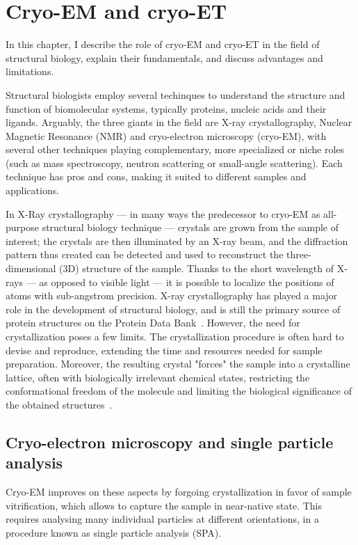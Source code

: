 \chapter{Cryo-EM and cryo-ET}

In this chapter, I describe the role of cryo-EM and cryo-ET in the field of structural biology, explain their fundamentals, and discuss advantages and limitations.

Structural biologists employ several techinques to understand the structure and function of biomolecular systems, typically proteins, nucleic acids and their ligands.
Arguably, the three giants in the field are X-ray crystallography, Nuclear Magnetic Resonance (NMR) and cryo-electron microscopy (cryo-EM), with several other techniques playing complementary, more specialized or niche roles (such as mass spectroscopy, neutron scattering or small-angle scattering).
Each technique has pros and cons, making it suited to different samples and applications.

In X-Ray crystallography --- in many ways the predecessor to cryo-EM as all-purpose structural biology technique --- crystals are grown from the sample of interest; the crystals are then illuminated by an X-ray beam, and the diffraction pattern thus created can be detected and used to reconstruct the three-dimensional (3D) structure of the sample.
Thanks to the short wavelength of X-rays --- as opposed to visible light --- it is possible to localize the positions of atoms with sub-angstrom precision.
X-ray crystallography has played a major role in the development of structural biology, and is still the primary source of protein structures on the Protein Data Bank~\cite{bermanProteinDataBank2000,bermanAnnouncingWorldwideProtein2003}.
However, the need for crystallization poses a few limits.
The crystallization procedure is often hard to devise and reproduce, extending the time and resources needed for sample preparation.
Moreover, the resulting crystal "forces" the sample into a crystalline lattice, often with biologically irrelevant chemical states, restricting the conformational freedom of the molecule and limiting the biological significance of the obtained structures~\cite{ravikumarComparisonSidechainDispersion2022}.

\section[Cryo-EM and SPA]{Cryo-electron microscopy and single particle analysis}

Cryo-EM improves on these aspects by forgoing crystallization in favor of sample vitrification, which allows to capture the sample in near-native state. This requires analysing many individual particles at different orientations, in a procedure known as single particle analysis (SPA).

